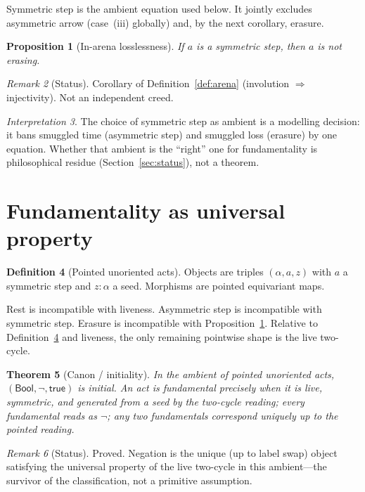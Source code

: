 \documentclass[11pt,a4paper]{article}
\theoremstyle{plain}
\newtheorem{theorem}{Theorem}[section]
\newtheorem{proposition}[theorem]{Proposition}
\theoremstyle{definition}
\newtheorem{definition}[theorem]{Definition}
\theoremstyle{remark}
\newtheorem{remark}[theorem]{Remark}
\newtheorem{interpretation}[theorem]{Interpretation}
\newcommand{\Bool}{\mathsf{Bool}}
\begin{document}
Symmetric step is the ambient equation used below. It jointly excludes
asymmetric arrow (case~(iii) globally) and, by the next corollary,
erasure.

\begin{proposition}[In-arena losslessness]
\label{prop:no-erase}
If $a$ is a symmetric step, then $a$ is not erasing.
\end{proposition}

\begin{remark}[Status]
Corollary of Definition~\ref{def:arena} (involution $\Rightarrow$
injectivity). Not an independent creed.
\end{remark}

\begin{interpretation}
\label{int:ambient}
The choice of symmetric step as ambient is a modelling decision: it
bans smuggled time (asymmetric step) and smuggled loss (erasure) by one
equation. Whether that ambient is the ``right'' one for fundamentality
is philosophical residue (Section~\ref{sec:status}), not a theorem.
\end{interpretation}


\section{Fundamentality as universal property}
\label{sec:fund}

\begin{definition}[Pointed unoriented acts]
\label{def:ambient}
Objects are triples $(\alpha,a,z)$ with $a$ a symmetric step and
$z:\alpha$ a seed. Morphisms are pointed equivariant maps.
\end{definition}

Rest is incompatible with liveness. Asymmetric step is incompatible with
symmetric step. Erasure is incompatible with Proposition~\ref{prop:no-erase}.
Relative to Definition~\ref{def:ambient} and liveness, the only remaining
pointwise shape is the live two-cycle.

\begin{theorem}[Canon / initiality]
\label{thm:canon}
In the ambient of pointed unoriented acts, $(\Bool,\neg,\mathsf{true})$
is initial. An act is \emph{fundamental} precisely when it is live,
symmetric, and generated from a seed by the two-cycle reading; every
fundamental reads as $\neg$; any two fundamentals correspond uniquely
up to the pointed reading.
\end{theorem}

\begin{remark}[Status]
Proved. Negation is the unique (up to label swap) object satisfying the
universal property of the live two-cycle in this ambient---the survivor
of the classification, not a primitive assumption.
\end{remark}
\end{document}
